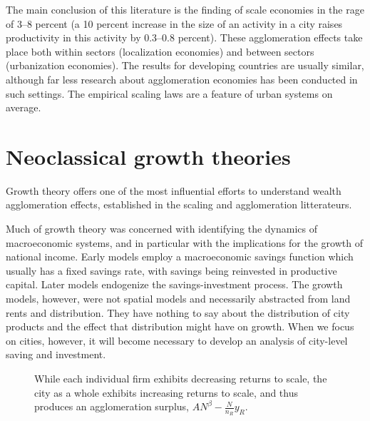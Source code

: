 {The main conclusion of this literature is the finding of scale economies in the rage of 3--8 percent (a 10 percent increase in the size of an activity in a city raises productivity in this activity by 0.3--0.8 percent). These agglomeration effects take place both within sectors (localization economies) and between sectors (urbanization economies). The results for developing countries are usually similar, although far less research about agglomeration economies has been conducted in such settings. 
The empirical \glspl{scaling law} are a feature of urban systems on average. %





\section{Neoclassical growth theories}  \label{section-growth}
{\color{red}



Growth theory offers one of the most influential efforts to understand wealth agglomeration effects, established in the scaling and agglomeration litterateurs.} 
Much of growth theory was concerned with identifying the dynamics of macroeconomic systems, and in particular with the implications for the growth of national income. Early models \cite{keynesGeneralTheoryEmployment1937, harrodEssayDynamicTheory1939, domarCapitalExpansionRate1946}  employ a macroeconomic savings function which usually has a fixed savings rate, with savings being reinvested in productive capital. Later models endogenize the savings-investment process. The growth models, however, were not spatial models and necessarily abstracted from land rents and distribution. They have nothing to say about the distribution of city products and the effect that distribution might have on growth. When we focus on cities, however, it will become necessary to develop an analysis of city-level saving and investment. 


\begin{figure}[htb]
    \centering

    \caption{While each individual firm exhibits decreasing returns to scale, the city as a whole exhibits increasing returns to scale, and thus produces an agglomeration surplus, $AN^\beta-\frac{N}{n_R}y_R$.}
    \label{fig-agglomeration-surplus} %
\end{figure}

}
